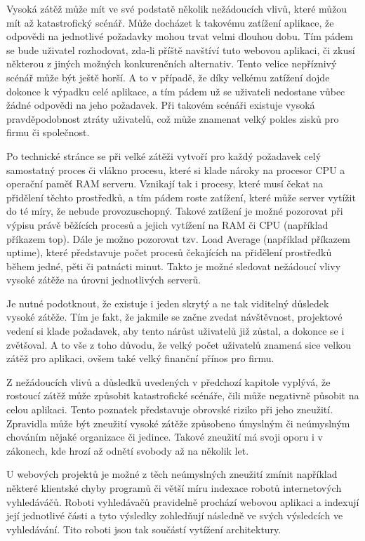\documentclass[12pt]{article}
\begin{document}
Vysoká zátěž může mít ve své podstatě několik nežádoucích vlivů, které můžou mít až katastrofický scénář. Může docházet k takovému zatížení aplikace, že odpovědi na jednotlivé požadavky mohou trvat velmi dlouhou dobu. Tím pádem se bude uživatel rozhodovat, zda-li příště navštíví tuto webovou aplikaci, či zkusí některou z jiných možných konkurenčních alternativ. Tento velice nepříznivý scénář může být ještě horší. A to v případě, že díky velkému zatížení dojde dokonce k výpadku celé aplikace, a tím pádem už se uživateli nedostane vůbec žádné odpovědi na jeho požadavek. Při takovém scénáři existuje vysoká pravděpodobnost ztráty uživatelů, což může znamenat velký pokles zisků pro firmu či společnost.

Po technické stránce se při velké zátěži vytvoří pro každý požadavek celý samostatný proces či vlákno procesu, které si klade nároky na procesor CPU a operační paměť RAM serveru. Vznikají tak i procesy, které musí čekat na přidělení těchto prostředků, a tím pádem roste zatížení, které může server vytížit do té míry, že nebude provozuschopný. Takové zatížení je možné pozorovat při výpisu právě běžících procesů a jejich vytížení na RAM či CPU (například příkazem top). Dále je možno pozorovat tzv. Load Average (například příkazem uptime), které představuje počet procesů čekajících na přidělení prostředků během jedné, pěti či patnácti minut. Takto je možné sledovat nežádoucí vlivy vysoké zátěže na úrovni jednotlivých serverů.\cite{sledovani-zatizeni}

Je nutné podotknout, že existuje i jeden skrytý a ne tak viditelný důsledek vysoké zátěže. Tím je fakt, že jakmile se začne zvedat návštěvnost, projektové vedení si klade požadavek, aby tento nárůst uživatelů již zůstal, a dokonce se i zvětšoval. A to vše z toho důvodu, že velký počet uživatelů znamená sice velkou zátěž pro aplikaci, ovšem také velký finanční přínos pro firmu.



Z nežádoucích vlivů a důsledků uvedených v předchozí kapitole vyplývá, že rostoucí zátěž může způsobit katastrofické scénáře, čili může negativně působit na celou aplikaci. Tento poznatek představuje obrovské riziko při jeho zneužití. Zpravidla může být zneužití vysoké zátěže způsobeno úmyslným či neúmyslným chováním nějaké organizace či jedince. Takové zneužití má svoji oporu i v zákonech, kde hrozí až odnětí svobody až na několik let.

U webových projektů je možné z těch neúmyslných zneužití zmínit například některé klientské chyby programů či větší míru indexace robotů internetových vyhledáváčů. Roboti vyhledávačů pravidelně prochází webovou aplikaci a indexují její jednotlivé části a tyto výsledky zohledňují následně ve svých výsledcích ve vyhledávání. Tito roboti jsou tak součástí vytížení architektury.
\end{document}
